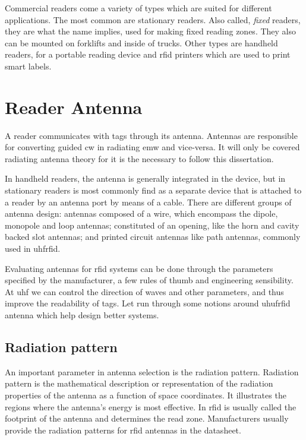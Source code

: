 Commercial readers come a variety of types which are suited for different applications.
The most common are stationary readers. Also called, \emph{fixed} readers, they are what the name implies, used for making fixed reading zones. They also can be mounted on forklifts and inside of trucks.
Other types are handheld readers, for a portable reading device and \ac{rfid} printers which are used to print smart labels.

\section{Reader Antenna} \label{sec:antenna}


A reader communicates with tags through its antenna. 
Antennas are responsible for converting guided \ac{cw} in radiating \ac{emw} and vice-versa.
It will only be covered radiating antenna theory for it is the necessary to follow this dissertation.

In handheld readers, the antenna is generally integrated in the device, but in stationary readers is most commonly find as a separate device that is attached to a reader by an antenna port by means of a cable.
There are different groups of antenna design: antennas composed of a wire, which encompass the dipole, monopole and loop antennas; constituted of an opening, like the horn and cavity backed slot antennas; and printed circuit antennas like path antennas, commonly used in \ac{uhfrfid}.

Evaluating antennas for \ac{rfid} systems can be done through the parameters specified by the manufacturer, a few rules of thumb and engineering sensibility.
At \ac{uhf} we can control the direction of waves and other parameters, and thus improve the readability of tags.
Let run through some notions around \ac{uhufrfid} antenna which help design better systems.

\subsection{Radiation pattern}

An important parameter in antenna selection is the radiation pattern. 
Radiation pattern is the mathematical description or representation of the radiation properties of the antenna as a function of space coordinates.
It illustrates the regions where the antenna's energy is most effective.
In \ac{rfid} is usually called the footprint of the antenna and determines the read zone.
Manufacturers usually provide the radiation patterns for \ac{rfid} antennas in the datasheet.

